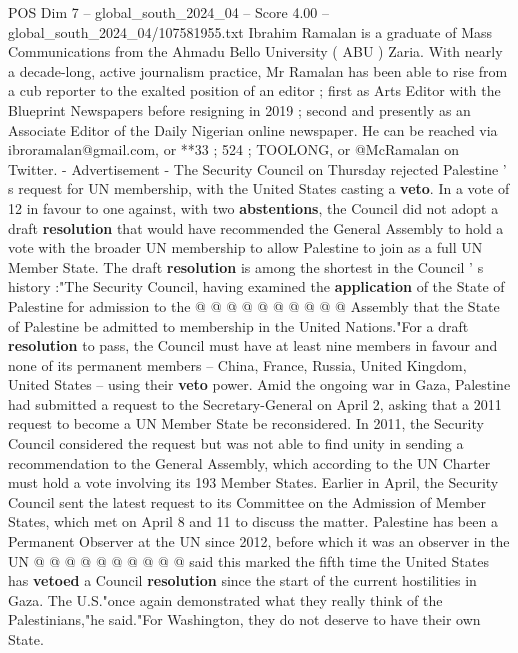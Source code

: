 \begin{textsample}{POS Dim 7 – global\_south\_2024\_04 – Score 4.00 – global\_south\_2024\_04/107581955.txt}  \label{ex:f7_pos_101}
Ibrahim Ramalan is a graduate of Mass Communications from the Ahmadu Bello University ( ABU ) Zaria.
With nearly a decade-long, active journalism practice, Mr Ramalan has been able to rise from a cub reporter to the exalted position of an editor ; first as Arts Editor with the Blueprint Newspapers before resigning in 2019 ; second and presently as an Associate Editor of the Daily Nigerian online newspaper.
He can be reached via ibroramalan@gmail.com, or **33 ; 524 ; TOOLONG, or @McRamalan on Twitter. - Advertisement - The Security Council on Thursday rejected Palestine ' s request for UN membership, with the United States casting a \textbf{veto}.
In a vote of 12 in favour to one against, with two \textbf{abstentions}, the Council did not adopt a draft \textbf{resolution} that would have recommended the General Assembly to hold a vote with the broader UN membership to allow Palestine to join as a full UN Member State.
The draft \textbf{resolution} is among the shortest in the Council ' s history :"The Security Council, having examined the \textbf{application} of the State of Palestine for admission to the @ @ @ @ @ @ @ @ @ @ Assembly that the State of Palestine be admitted to membership in the United Nations."For a draft \textbf{resolution} to pass, the Council must have at least nine members in favour and none of its permanent members -- China, France, Russia, United Kingdom, United States -- using their \textbf{veto} power.
Amid the ongoing war in Gaza, Palestine had submitted a request to the Secretary-General on April 2, asking that a 2011 request to become a UN Member State be reconsidered.
In 2011, the Security Council considered the request but was not able to find unity in sending a recommendation to the General Assembly, which according to the UN Charter must hold a vote involving its 193 Member States.
Earlier in April, the Security Council sent the latest request to its Committee on the Admission of Member States, which met on April 8 and 11 to discuss the matter.
Palestine has been a Permanent Observer at the UN since 2012, before which it was an observer in the UN @ @ @ @ @ @ @ @ @ @ said this marked the fifth time the United States has \textbf{vetoed} a Council \textbf{resolution} since the start of the current hostilities in Gaza.
The U.S."once again demonstrated what they really think of the Palestinians,"he said."For Washington, they do not deserve to have their own State.

\end{textsample}
